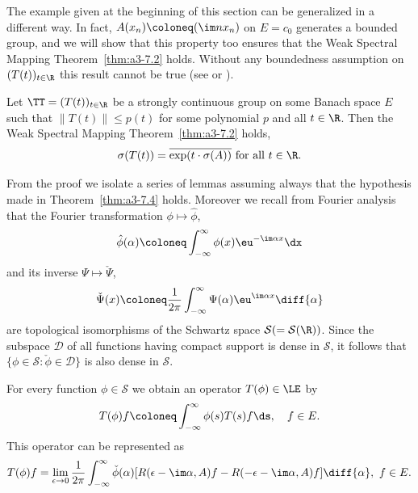 The example given at the beginning of this section can be generalized in a different way.
In fact, $A(x_{n}) \coloneq (\im nx_{n})$ on $E = c_{0}$ generates a bounded group, and we will show that this property too ensures that the Weak Spectral Mapping Theorem~\ref{thm:a3-7.2} holds.
Without any boundedness assumption on $(T(t))_{t\in\R}$ this result cannot be true (see \textcite[Sec.23.16]{hillephillips:1957} or \textcite{wolff:1981}).
\begin{theorem}\label{thm:a3-7.4}
Let $\TT = (T(t))_{t\in\R}$ be a strongly continuous group on some Banach space $E$ such that $\|T(t)\| \leq p(t)$ for some polynomial $p$ and all $t \in \R$.
Then the Weak Spectral Mapping Theorem~\ref{thm:a3-7.2} holds, \ie 
\[
\sigma(T(t)) = \overline{\exp(t\cdot\sigma(A))} \text{ for all } t \in \R .
\]
\end{theorem}
From the proof we isolate a series of lemmas assuming always that the hypothesis made in Theorem~\ref{thm:a3-7.4} holds.
Moreover we recall from Fourier analysis that the Fourier transformation $\phi \mapsto \hat{\phi}$,
\[
\hat{\phi}(\alpha) \coloneq \int_{-\infty}^{\infty} \phi(x)\eu^{-\im\alpha x} \dx
\]
and its inverse $\Psi \mapsto \check{\Psi}$,
\[
\check{\Psi}(x) \coloneq \frac{1}{2\pi}\int_{-\infty}^{\infty}\Psi(\alpha)\eu^{\im\alpha x} 		\diff{\alpha}
\]
are topological isomorphisms of the Schwartz space $\mathcal{S} ( = \mathcal{S}(\R))$.
Since the subspace $\mathcal{D}$ of all functions having compact support is dense in $\mathcal{S}$, it follows that $\{\phi \in \mathcal{S} \colon \check{\phi} \in \mathcal{D}\}$ is also dense in $\mathcal{S}$.
\begin{lemma}\label{lem:a3-7.5}
For every function $\phi \in \mathcal{S}$ we obtain an operator $T(\phi) \in \LE$ by
\[
T(\phi)f \coloneq \int_{-\infty}^{\infty} \phi(s)T(s)f \ds, \quad f \in E .
\]
This operator can be represented as
\begin{equation}\label{eq:a3-7.3}
T(\phi)f = \lim_{\epsilon\to 0} \frac{1}{2\pi}\int_{-\infty}^{\infty} \check{\phi}(\alpha)[R(\epsilon-\im\alpha,A)f - R(-\epsilon-\im\alpha,A)f] \diff{\alpha}, \ f \in E .
\end{equation}
\end{lemma}
